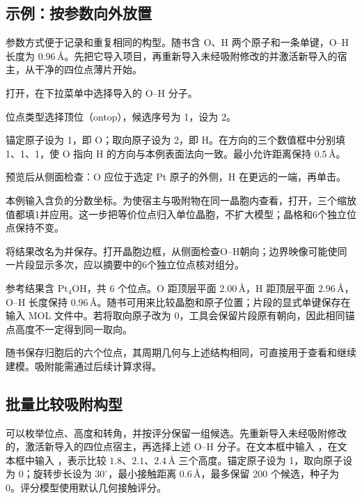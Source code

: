 \subsection{示例：按参数向外放置 }

参数方式便于记录和重复相同的构型。随书含 O、H 两个原子和一条单键，O--H 长度为 $0.96\,\text{\AA}$。先把它导入项目，再重新导入未经吸附修改的并激活新导入的宿主，从干净的四位点薄片开始。

\begin{steps}
  \item 打开，在下拉菜单中选择导入的 O--H 分子。
  \item 位点类型选择顶位（ontop），候选序号为 1，设为 2。
  \item 锚定原子设为 1，即 O；取向原子设为 2，即 H。在方向的三个数值框中分别填 1、1、1，使 O 指向 H 的方向与本例表面法向一致。最小允许距离保持 $0.5\,\text{\AA}$。
  \item 预览后从侧面检查：O 应位于选定 Pt 原子的外侧，H 在更远的一端，再单击。
  \item 本例输入含负的分数坐标。为使宿主与吸附物在同一晶胞内查看，打开，三个缩放值都填1并应用。这一步把等价位点归入单位晶胞，不扩大模型；晶格和6个独立位点保持不变。
  \item 将结果改名为并保存。打开晶胞边框，从侧面检查O--H朝向；边界映像可能使同一片段显示多次，应以摘要中的6个独立位点核对组分。
\end{steps}



参考结果含 $\mathrm{Pt_4OH}$，共 6 个位点。O 距顶层平面 $2.00\,\text{\AA}$，H 距顶层平面 $2.96\,\text{\AA}$，O--H 长度保持 $0.96\,\text{\AA}$。随书可用来比较晶胞和原子位置；片段的显式单键保存在输入 MOL 文件中。若将取向原子改为 0，工具会保留片段原有朝向，因此相同锚点高度不一定得到同一取向。

随书保存归胞后的六个位点，其周期几何与上述结构相同，可直接用于查看和继续建模。吸附能需通过后续计算求得。

\subsection{批量比较吸附构型}

可以枚举位点、高度和转角，并按评分保留一组候选。先重新导入未经吸附修改的，激活新导入的四位点宿主，再选择上述 O--H 分子。在文本框中输入 ，在文本框中输入 ，表示比较 $1.8$、$2.1$、$2.4\,\text{\AA}$ 三个高度。锚定原子设为 1，取向原子设为 0；旋转步长设为 $30^\circ$，最小接触距离 $0.6\,\text{\AA}$，最多保留 200 个候选，种子为 0。评分模型使用默认几何接触评分。


